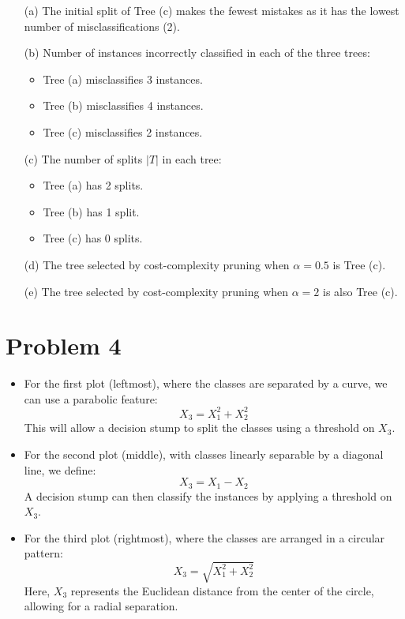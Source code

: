 \documentclass{article}
\begin{document}
\begin{enumerate}
    \item[(a)] The initial split of Tree (c) makes the fewest mistakes as it has the lowest number of misclassifications (2).
    \item[(b)] Number of instances incorrectly classified in each of the three trees:
    \begin{itemize}
        \item Tree (a) misclassifies 3 instances.
        \item Tree (b) misclassifies 4 instances.
        \item Tree (c) misclassifies 2 instances.
    \end{itemize}
    \item[(c)] The number of splits \( |T| \) in each tree:
    \begin{itemize}
        \item Tree (a) has 2 splits.
        \item Tree (b) has 1 split.
        \item Tree (c) has 0 splits.
    \end{itemize}
    \item[(d)] The tree selected by cost-complexity pruning when \( \alpha = 0.5 \) is Tree (c).
    \item[(e)] The tree selected by cost-complexity pruning when \( \alpha = 2 \) is also Tree (c).
\end{enumerate}

\section*{Problem 4}
\begin{itemize}
    \item For the first plot (leftmost), where the classes are separated by a curve, we can use a parabolic feature:
    \[ X_3 = X_1^2 + X_2^2 \]
    This will allow a decision stump to split the classes using a threshold on \( X_3 \).
    
    \item For the second plot (middle), with classes linearly separable by a diagonal line, we define:
    \[ X_3 = X_1 - X_2 \]
    A decision stump can then classify the instances by applying a threshold on \( X_3 \).
    
    \item For the third plot (rightmost), where the classes are arranged in a circular pattern:
    \[ X_3 = \sqrt{X_1^2 + X_2^2} \]
    Here, \( X_3 \) represents the Euclidean distance from the center of the circle, allowing for a radial separation.
\end{itemize}
\end{document}
